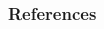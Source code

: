 \documentclass[aspectratio=169]{beamer}
\begin{document}

  \begin{frame}
    \frametitle{References}
    \tiny
    \begin{multicols}{2}
      \nocite{*}
      
    \end{multicols}
  \end{frame}
\end{document}
